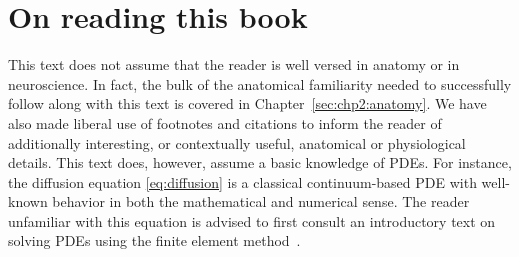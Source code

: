 %


\section{On reading this book}
This text does not assume that the reader is well versed in anatomy or in 
neuroscience.  In fact, the bulk of the anatomical familiarity needed to 
successfully follow along with this text is covered in 
Chapter~\ref{sec:chp2:anatomy}.  We have also made liberal use of footnotes and 
citations to inform the reader of additionally interesting, or contextually 
useful, anatomical or physiological details. This text does, however, assume a 
basic knowledge of PDEs. For instance, the diffusion equation 
\eqref{eq:diffusion} is a classical continuum-based PDE with well-known 
behavior in both the mathematical and numerical sense. The reader unfamiliar 
with this equation is advised to first consult an introductory text on solving 
PDEs using the finite element
method~\cite{gockenbach2006understanding,
  langtangen2016solving, langtangen2019introduction,tveito2004introduction}.

